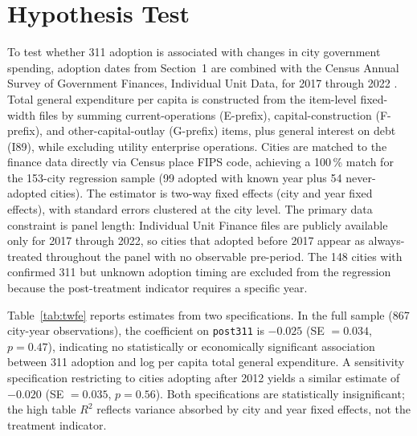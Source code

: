 \section{Hypothesis Test}

To test whether 311 adoption is associated with changes in city government spending,
adoption dates from Section~1 are combined with the Census Annual Survey of
Government Finances, Individual Unit Data, for 2017 through 2022
\citep{census_govfin2022}.
Total general expenditure per capita is constructed from the item-level fixed-width
files by summing current-operations (E-prefix), capital-construction (F-prefix), and
other-capital-outlay (G-prefix) items, plus general interest on debt (I89), while
excluding utility enterprise operations.
Cities are matched to the finance data directly via Census place FIPS code,
achieving a 100\,\% match for the 153-city regression sample (99 adopted with known
year plus 54 never-adopted cities).
The estimator is two-way fixed effects (city and year fixed effects), with standard
errors clustered at the city level.
The primary data constraint is panel length: Individual Unit Finance files are
publicly available only for 2017 through 2022, so cities that adopted before 2017
appear as always-treated throughout the panel with no observable pre-period.
The 148 cities with confirmed 311 but unknown adoption timing are excluded from
the regression because the post-treatment indicator requires a specific year.

Table~\ref{tab:twfe} reports estimates from two specifications.
In the full sample (867 city-year observations), the coefficient on \texttt{post311}
is $-0.025$ (SE $= 0.034$, $p = 0.47$), indicating no statistically or economically
significant association between 311 adoption and log per capita total general
expenditure.
A sensitivity specification restricting to cities adopting after 2012 yields a
similar estimate of $-0.020$ (SE $= 0.035$, $p = 0.56$).
Both specifications are statistically insignificant; the high table $R^2$ reflects
variance absorbed by city and year fixed effects, not the treatment indicator.

\begin{table}[htbp]
  \centering
  \caption{Effect of 311 adoption on log per capita total general expenditure.}
  \label{tab:twfe}
  
\end{table}

